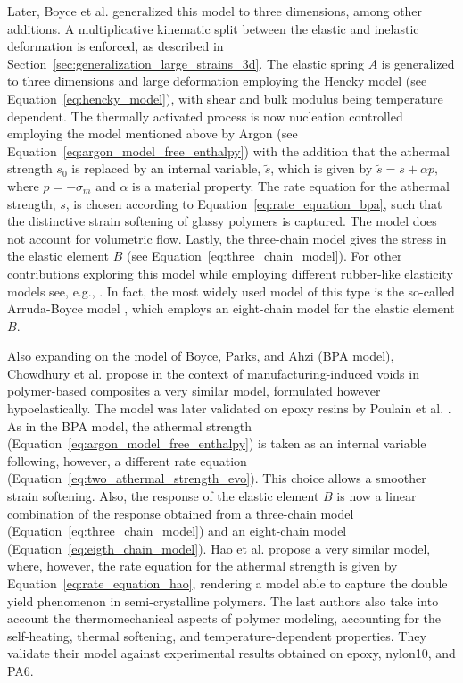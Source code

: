 Later, Boyce et al. \citep{boyceLargeInelasticDeformation1988} generalized this model to three dimensions, among other additions.
A multiplicative kinematic split between the elastic and inelastic deformation is enforced, as described in Section~\ref{sec:generalization_large_strains_3d}.
The elastic spring $A$ is generalized to three dimensions and large deformation employing the Hencky model (see Equation~\eqref{eq:hencky_model}), with shear and bulk modulus being temperature dependent.
The thermally activated process is now nucleation controlled employing the model mentioned above by Argon \citep{argonTheoryLowtemperaturePlastic1973} (see Equation~\eqref{eq:argon_model_free_enthalpy}) with the addition that the athermal strength $s_0$ is replaced by an internal variable, $\tilde s$, which is given by $\tilde{s}=s+\alpha p,$ where $p=-\sigma_m$ and $\alpha$ is a material property.
The rate equation for the athermal strength, $s$, is chosen according to Equation~\eqref{eq:rate_equation_bpa}, such that the distinctive strain softening of glassy polymers is captured.
The model does not account for volumetric flow.
Lastly, the three-chain model gives the stress in the elastic element $B$ (see Equation~\eqref{eq:three_chain_model}).
For other contributions exploring this model while employing different rubber-like elasticity models see, e.g., \cite{arrudaEvolutionPlasticAnisotropy1993, arrudaEffectsStrainRate1995, wuImprovedNetworkModels1993, buckleyGlassrubberConstitutiveModel1995, sweeneyRateDependentNetwork1995}.
In fact, the most widely used model of this type is the so-called Arruda-Boyce model \citep{arrudaEvolutionPlasticAnisotropy1993, arrudaEffectsStrainRate1995}, which employs an eight-chain model for the elastic element $B$.

Also expanding on the model of Boyce, Parks, and Ahzi \citep{boyceLargeInelasticDeformation1988} (BPA model), Chowdhury et al. \citep{chowdhuryEffectsManufacturingInducedVoids2008} propose in the context of manufacturing-induced voids in polymer-based composites a very similar model, formulated however hypoelastically.
The model was later validated on epoxy resins by Poulain et al. \citep{poulainFinitestrainElastoviscoplasticBehavior2014}.
As in the BPA model, the athermal strength (Equation~\eqref{eq:argon_model_free_enthalpy}) is taken as an internal variable following, however, a different rate equation (Equation~\eqref{eq:two_athermal_strength_evo}).
This choice allows a smoother strain softening.
Also, the response of the elastic element $B$ is now a linear combination of the response obtained from a three-chain model (Equation~\eqref{eq:three_chain_model}) and an eight-chain model (Equation~\eqref{eq:eigth_chain_model}).
Hao et al. \citep{haoUnifiedAmorphousCrystalline2022} propose a very similar model, where, however, the rate equation for the athermal strength is given by Equation~\eqref{eq:rate_equation_hao}, rendering a model able to capture the double yield phenomenon in semi-crystalline polymers.
The last authors also take into account the thermomechanical aspects of polymer modeling, accounting for the self-heating, thermal softening, and temperature-dependent properties.
They validate their model against experimental results obtained on epoxy, nylon10, and PA6.

